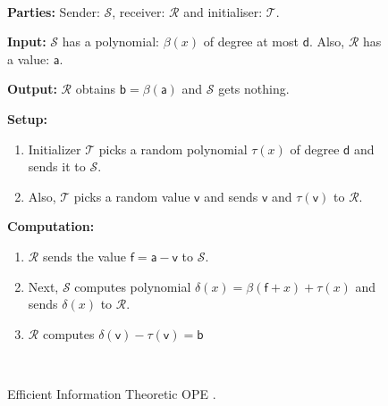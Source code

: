 




\begin{figure}[ht]
\setlength{\fboxsep}{2pt}
\begin{center}
\begin{boxedminipage}{11cm}
\small{

\

\noindent\textbf {Parties:} Sender: $\mathcal{S}$, receiver: $\mathcal{R}$ and initialiser: $\mathcal{T}$.

\noindent\textbf {Input:} $\mathcal{S}$ has a polynomial: $\beta(x)$  of degree at most $\mathsf{d}$. Also, $\mathcal{R}$ has a value:  $\mathsf{a}$.

\noindent\textbf {Output:} $\mathcal{R}$ obtains $\mathsf{b}=\beta(\mathsf{a})$ and $\mathcal{S}$ gets nothing.

\noindent\textbf {Setup:} 
\begin{enumerate}
\item Initializer $\mathcal{T}$ picks a random polynomial $\tau(x)$ of degree $\mathsf{d}$ and sends it to $\mathcal{S}$. 
\item Also, $\mathcal{T}$ picks a random value $\mathsf{v}$ and sends $\mathsf{v}$ and $\tau(\mathsf{v})$ to $\mathcal{R}$.
\end{enumerate}

\noindent\textbf {Computation:} 
\begin{enumerate}
\item $\mathcal{R}$ sends the value $\mathsf{f}=\mathsf{a}-\mathsf{v}$ to $\mathcal{S}$. 
\item Next, $\mathcal{S}$  computes polynomial $\delta(x)=\beta(\mathsf{f}+x)+\tau(x)$ and sends $\delta(x)$ to $\mathcal{R}$.
\item $\mathcal{R}$ computes $\delta(\mathsf{v})-\tau(\mathsf{v})=\mathsf{b}$
 \end{enumerate}
 \
}


\end{boxedminipage}
\end{center}
\caption{Efficient Information Theoretic OPE \cite{DBLP:conf/acisp/HanaokaIMNOW04}.} 
\label{fig:subroutines}
\end{figure}







